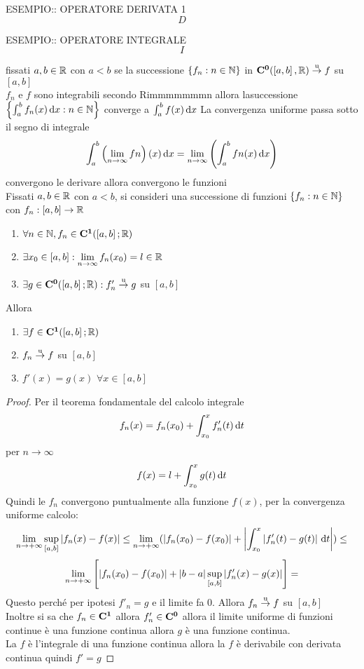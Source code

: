 ESEMPIO:: OPERATORE DERIVATA 1\\
\[D\]

ESEMPIO:: OPERATORE INTEGRALE\\
\[I\]

\proposition
fissati $a,b\in \mathbb{R}$ con $a<b$ se la successione $\left\{f_n:n\in\mathbb{N}\right\}$ in $\mathbf{C^{0}}(\left[a,b\right], \mathbb{R}) \overset{\text{u}}{\to} f$ su $\left[a,b\right]$\\
$f_n$ e $f$ sono integrabili secondo Rimmmmmmmn allora lasuccessione $\left\{\int_a^bf_n(x)\,\mathrm{d}{x}:n\in\mathbb{N}\right\}$ converge a $\int_a^bf(x)\,\mathrm{d}{x}$
\observation
La convergenza uniforme passa sotto il segno di integrale
\[\int_a^b\left(\lim\limits_{n\to\infty}fn\right)(x)\,\mathrm{d}{x}=\lim\limits_{n\to\infty}\left(\int_a^bfn(x)\,\mathrm{d}{x}\right)\]
\proposition convergono le derivare allora convergono le funzioni\\
Fissati $a,b\in \mathbb{R}$ con $a<b$, si consideri una successione di funzioni $\left\{f_n:n\in\mathbb{N}\right\}$ con $f_n:\left[a,b\right]\to \mathbb{R}$
\begin{enumerate}
	\item $\forall n\in\mathbb{N}, f_n\in \mathbf{C^{1}}(\left[a,b\right]; \mathbb{R})$
	\item $\exists x_0\in\left[a,b\right]: \lim\limits_{n\to\infty}f_n(x_0)=l\in \mathbb{R}$
	\item $\exists g \in \mathbf{C^{0}}(\left[a,b\right]; \mathbb{R}):f'_n \overset{\text{u}}{\to} g$ su $\left[a,b\right]$
\end{enumerate}
Allora
\begin{enumerate}
	\item $\exists f\in \mathbf{C^{1}}(\left[a,b\right]; \mathbb{R})$
	\item $f_n \overset{\text{u}}{\to} f$ su $\left[a,b\right]$
	\item $f'(x)=g(x)$ $\forall x\in\left[a,b\right]$
\end{enumerate}
\begin{proof}
	Per il teorema fondamentale del calcolo integrale
	\[f_n(x)=f_n(x_0)+\int_{x_0}^{x}f_n'(t)\,\mathrm{d}{t}\]
	per $n\to\infty$
	\[f(x)=l+\int_{x_0}^{x}g(t)\,\mathrm{d}{t}\]
	Quindi le $f_n$ convergono puntualmente alla funzione $f(x)$, per la convergenza uniforme calcolo:
	\[ \lim\limits_{n\to+\infty}\sup\limits_{\left[a,b\right]}\left|f_n(x)-f(x)\right| \leq \lim\limits_{n\to+\infty}(\left|f_n(x_0)-f(x_0)\right|+\left|\int_{x_0}^x \left|f_n'(t)-g(t)\right|\,\mathrm{d}{t}\right|) \leq \]
	\[\lim\limits_{n\to+\infty}\left[ \left|f_n(x_0)-f(x_0)\right|+\left|b-a\right|\sup\limits_{\left[a,b\right]}\left|f_n'(x)-g(x)\right| \right] = \]
	Questo perché per ipotesi $f'_n=g$ e il limite fa $0$.
	Allora $f_n \overset{\text{u}}{\to} f$ su $\left[a,b\right]$\\
	Inoltre si sa che $f_n\in \mathbf{C^{1}}$ allora $f_n'\in \mathbf{C^{0}}$ allora il limite uniforme di funzioni continue è una funzione continua allora $g$ è una funzione continua.\\
	La $f$ è l'integrale di una funzione continua allora la $f$ è derivabile con derivata continua quindi $f'=g$
\end{proof}
